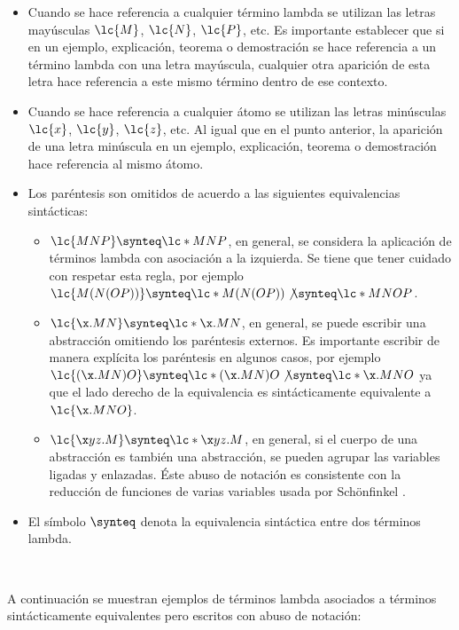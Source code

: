 \begin{itemize}
\item Cuando se hace referencia a cualquier término lambda se utilizan las
  letras mayúsculas \(\lc{M}\), \(\lc{N}\), \(\lc{P}\), etc. Es importante
  establecer que si en un ejemplo, explicación, teorema o demostración se hace
  referencia a un término lambda con una letra mayúscula, cualquier otra
  aparición de esta letra hace referencia a este mismo término dentro de ese
  contexto.
\item Cuando se hace referencia a cualquier átomo se utilizan las letras
  minúsculas \(\lc{x}\), \(\lc{y}\), \(\lc{z}\), etc. Al igual que en el punto
  anterior, la aparición de una letra minúscula en un ejemplo, explicación,
  teorema o demostración hace referencia al mismo átomo.
\item Los paréntesis son omitidos de acuerdo a las siguientes equivalencias
  sintácticas:
  \begin{itemize}
  \item \(\lc{M N P} \synteq \lc*{M N P}\), en general, se considera la
    aplicación de términos lambda con asociación a la izquierda. Se tiene que
    tener cuidado con respetar esta regla, por ejemplo \(\lc{M(N(O
      P))} \synteq \lc*{M(N(O P))} \not\synteq \lc*{M N O P}\).
  \item \(\lc{\x.M N} \synteq \lc*{\x.M N}\), en general, se puede escribir una
    abstracción omitiendo los paréntesis externos. Es importante escribir de
    manera explícita los paréntesis en algunos casos, por ejemplo \(\lc{(\x.M N) O} \synteq
    \lc*{(\x.M N) O} \not\synteq \lc*{\x.M N O}\) ya que el lado derecho de la
    equivalencia es sintácticamente equivalente a \(\lc{\x.M N O}\).
  \item \(\lc{\x y z.M} \synteq \lc*{\x y z.M}\), en general, si el cuerpo de
    una abstracción es también una abstracción, se pueden agrupar las variables
    ligadas y enlazadas. Éste abuso de notación es consistente con la reducción
    de funciones de varias variables usada por Schönfinkel \cite{Schonfinkel:Varargs}.
  \end{itemize}
\item El símbolo \(\synteq\) denota la equivalencia sintáctica entre dos
  términos lambda.
\end{itemize} \

A continuación se muestran ejemplos de términos lambda asociados a términos
sintácticamente equivalentes pero escritos con abuso de notación: \\

